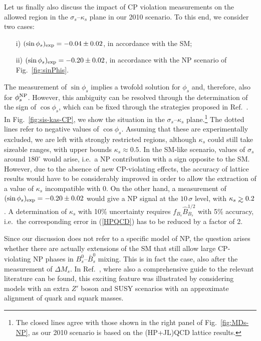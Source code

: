 \documentclass[12pt]{article}
\newcommand{\gsim}{
\mathrel{\hbox{\rlap{\hbox{\lower4pt\hbox{$\sim$}}}\hbox{$>$}}}}
\begin{document}
Let us finally also discuss the impact of CP violation measurements 
on the allowed region in the $\sigma_s$--$\kappa_s$ plane in our 2010
scenario. To this end, we consider two cases:
\begin{itemize}
\item[i)] $(\sin\phi_s)_{\rm exp}=-0.04\pm0.02$, in accordance with the SM;
\item[ii)] $(\sin\phi_s)_{\rm exp}=-0.20\pm0.02$, in accordance with the NP 
scenario of Fig.~\ref{fig:sinPhis}.
\end{itemize}
The measurement of $\sin\phi_s$ implies a twofold solution for $\phi_s$
and, therefore, also for $\phi_s^{\rm NP}$. However, this ambiguity can 
be resolved through the determination of the sign of $\cos\phi_s$, which
can be fixed through the strategies proposed in Ref.~\cite{DFN}. In 
Fig.~\ref{fig:sis-kas-CP}, we show the situation in the
$\sigma_s$--$\kappa_s$ plane.\footnote{The closed lines agree with those
shown in the right panel of Fig.~\ref{fig:MDs-NP}, as our 2010
scenario is based on the (HP+JL)QCD lattice results.} The dotted lines refer to negative
values of $\cos\phi_s$. Assuming that these are experimentally excluded,
we are left with strongly restricted regions, although $\kappa_s$ could still
take sizeable ranges, with upper bounds $\kappa_s\approx0.5$.
In the SM-like scenario, values of $\sigma_s$ around
$180^\circ$ would arise, i.e.\ a NP contribution with a sign opposite to 
the SM. However, due to the absence of new CP-violating effects, 
the accuracy of lattice results would have to be considerably improved
in order to allow the extraction of a value of  $\kappa_s$ incompatible with 0.
On the other hand, a measurement of $(\sin\phi_s)_{\rm exp}=-0.20\pm0.02$
would give a NP signal at the $10\,\sigma$ level, with $\kappa_s\gsim0.2$.
A determination of  $\kappa_s$ with 10\% uncertainty requires 
$f_{B_s}\hat B_{B_s}^{1/2}$ with 5\% accuracy, i.e.\  the corresponding error 
in (\ref{HPQCD}) has to be reduced by a factor of 2.


Since our discussion  does not refer to a specific model of NP, the 
question arises whether there are actually extensions of the SM that still allow 
large CP-violating NP phases in $B^0_s$--$\bar B^0_s$ mixing. This is in
fact the case, also after the measurement of $\Delta M_s$. In Ref.~\cite{BF-DMs},
where also a comprehensive guide to the relevant literature can be found, 
this exciting feature was illustrated by considering models with an extra $Z'$ boson 
and SUSY scenarios with an approximate alignment of quark and squark masses.
\end{document}
